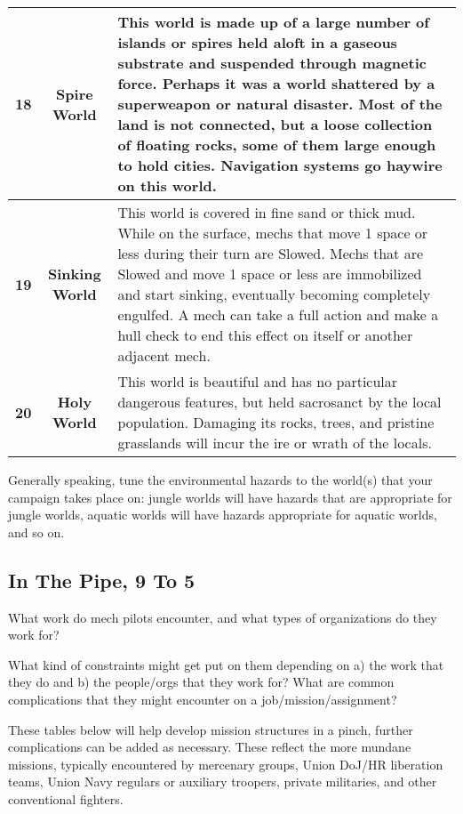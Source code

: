 \begin{longtable}{|c|c|p{10cm}|}
    \textbf{18} & \textbf{Spire World} & This world is made up of a large number of islands or spires held aloft in a gaseous substrate and suspended through magnetic force. Perhaps it was a world shattered by a superweapon or natural disaster. Most of the land is not connected, but a loose collection of floating rocks, some of them large enough to hold cities. Navigation systems go haywire on this world.\\ \hline
    \textbf{19} & \textbf{Sinking World} & This world is covered in fine sand or thick mud. While on the surface, mechs that move 1 space or less during their turn are Slowed. Mechs that are Slowed and move 1 space or less are immobilized and start sinking, eventually becoming completely engulfed. A mech can take a full action and make a hull check to end this effect on itself or another adjacent mech.\\ \hline
    \textbf{20} & \textbf{Holy World} & This world is beautiful and has no particular dangerous features, but held sacrosanct by the local population. Damaging its rocks, trees, and pristine grasslands will incur the ire or wrath of the locals. \\ \hline
\end{longtable}  

Generally speaking, tune the environmental hazards to the world(s) that your campaign takes place on: jungle worlds will have hazards that are appropriate for jungle worlds, aquatic worlds will have hazards appropriate for aquatic worlds, and so on.

\subsection{In The Pipe, 9 To 5 }

What work do mech pilots encounter, and what types of organizations do they work for?

What kind of constraints might get put on them depending on a) the work that they do and b) the
people/orgs that they work for? What are common complications that they might encounter on a
job/mission/assignment?

These tables below will help develop mission structures in a pinch, further complications can be
added as necessary. These reflect the more mundane missions, typically encountered by
mercenary groups, Union DoJ/HR liberation teams, Union Navy regulars or auxiliary troopers,
private militaries, and other conventional fighters.

